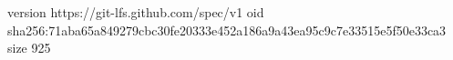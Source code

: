 version https://git-lfs.github.com/spec/v1
oid sha256:71aba65a849279cbc30fe20333e452a186a9a43ea95c9c7e33515e5f50e33ca3
size 925

